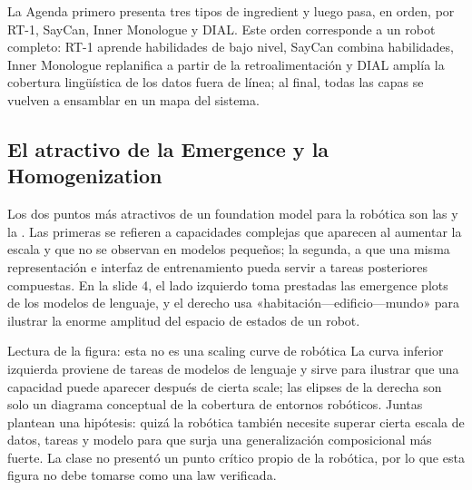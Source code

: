 La Agenda primero presenta tres tipos de ingredient y luego pasa, en orden, por RT-1, SayCan, Inner Monologue y DIAL. Este orden corresponde a un robot completo: RT-1 aprende habilidades de bajo nivel, SayCan combina habilidades, Inner Monologue replanifica a partir de la retroalimentación y DIAL amplía la cobertura lingüística de los datos fuera de línea; al final, todas las capas se vuelven a ensamblar en un mapa del sistema.


\subsection{El atractivo de la Emergence y la Homogenization}

Los dos puntos más atractivos de un foundation model para la robótica son las  y la . Las primeras se refieren a capacidades complejas que aparecen al aumentar la escala y que no se observan en modelos pequeños; la segunda, a que una misma representación e interfaz de entrenamiento pueda servir a tareas posteriores compuestas. En la slide 4, el lado izquierdo toma prestadas las emergence plots de los modelos de lenguaje, y el derecho usa «habitación—edificio—mundo» para ilustrar la enorme amplitud del espacio de estados de un robot.


\begin{knowledgebox}{Lectura de la figura: esta no es una scaling curve de robótica}
La curva inferior izquierda proviene de tareas de modelos de lenguaje y sirve para ilustrar que una capacidad puede aparecer después de cierta scale; las elipses de la derecha son solo un diagrama conceptual de la cobertura de entornos robóticos. Juntas plantean una hipótesis: quizá la robótica también necesite superar cierta escala de datos, tareas y modelo para que surja una generalización composicional más fuerte. La clase no presentó un punto crítico propio de la robótica, por lo que esta figura no debe tomarse como una law verificada.
\end{knowledgebox}

